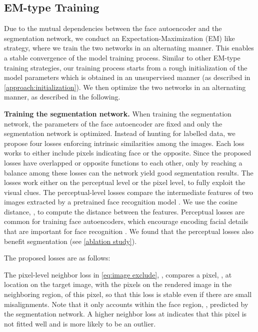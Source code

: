 \documentclass[10pt,twocolumn,letterpaper]{article}
\begin{document}
\subsection{EM-type Training}
\label{approach:EM}
Due to the mutual dependencies between the face autoencoder and the segmentation network, we conduct an Expectation-Maximization (EM) like strategy, where we train the two networks in an alternating manner. 
This enables a stable convergence of the model training process. Similar to other EM-type training strategies, our training process starts from a rough initialization of the model parameters which is obtained in an unsupervised manner (as described in \cref{approach:initialization}). We then optimize the two networks in an alternating manner, as described in the following.

\textbf{Training the segmentation network.} 
When training the segmentation network, the parameters of the face autoencoder are fixed and only the segmentation network is optimized. 
Instead of hunting for labelled data, we propose four losses enforcing intrinsic similarities among the images. Each loss works to either include pixels indicating face or the opposite. Since the proposed losses have overlapped or opposite functions to each other, only by reaching a balance among these losses can the network yield good segmentation results.
The losses work either on the perceptual level or the pixel level, to fully exploit the visual clues. The perceptual-level losses compare the intermediate features of two images extracted by a pretrained face recognition model .
We use the cosine distance, , to compute the distance between the features. Perceptual losses are common for training face autoencoders, which encourage encoding facial details that are important for face recognition \cite{DECA}. We found that the perceptual losses also benefit segmentation (see \cref{ablation study}). 


The proposed losses are as follows:
\begin{small}

\end{small}
The pixel-level neighbor loss in \cref{eq:image exclude}, , compares a pixel, , at location  on the target image, with the pixels on the rendered image in the neighboring region,  of this pixel, so that this loss is stable even if there are small misalignments. Note that it only accounts within the face region, , predicted by the segmentation network. A higher neighbor loss at  indicates that this pixel is not fitted well and is more likely to be an outlier.
\end{document}
